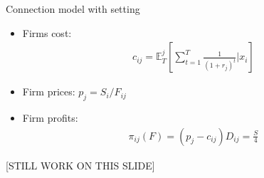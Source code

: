 \documentclass[10pt,aspectratio=169]{beamer}
\begin{document}
\begin{frame}{Connection model with setting}\label{slide:connection}    
\begin{itemize}
    \item Firms cost: 
    \begin{align*}
        c_{ij} =  \mathbb{E}^j_{T} \left[\sum_{t=1}^T\frac{1}{(1+r_j)^t}|x_i \right]
    \end{align*}  
    \item Firm prices: $p_j = S_i/F_{ij}$
    \item Firm profits: 
    \begin{align*}
        \pi_{ij}(F) = (p_j - c_{ij}) D_{ij} = \frac{S}{4}
    \end{align*}
\end{itemize}

\hyperlink{slide:timeline}{}
[STILL WORK ON THIS SLIDE]
\end{frame}
\end{document}
